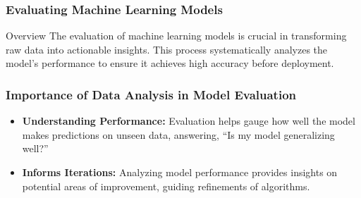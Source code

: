 \documentclass[aspectratio=169]{beamer}
\begin{document}
\begin{frame}[fragile]
    \frametitle{Evaluating Machine Learning Models}
    \begin{block}{Overview}
        The evaluation of machine learning models is crucial in transforming raw data into actionable insights. This process systematically analyzes the model’s performance to ensure it achieves high accuracy before deployment.
    \end{block}
\end{frame}

\begin{frame}[fragile]
    \frametitle{Importance of Data Analysis in Model Evaluation}
    \begin{itemize}
        \item \textbf{Understanding Performance:} 
            Evaluation helps gauge how well the model makes predictions on unseen data, answering, “Is my model generalizing well?”
        \item \textbf{Informs Iterations:} 
            Analyzing model performance provides insights on potential areas of improvement, guiding refinements of algorithms.
    \end{itemize}
\end{frame}
\end{document}
